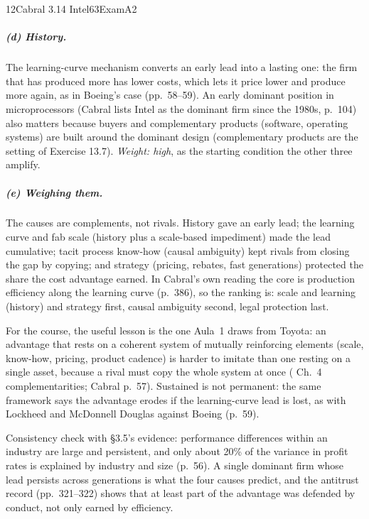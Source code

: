 \begin{exsol}{12}{Cabral 3.14 Intel}{63}{Exam}{A2}
\subparagraph{(d) History.} The learning-curve mechanism converts an early lead into a lasting
one: the firm that has produced more has lower costs, which lets it price lower and produce more
again, as in Boeing's case (pp.~58--59). An early dominant position in microprocessors (Cabral
lists Intel as the dominant firm since the 1980s, p.~104) also matters because buyers and
complementary products (software, operating systems) are built around the dominant design
(complementary products are the setting of Exercise 13.7). \emph{Weight: high}, as the starting
condition the other three amplify.

\subparagraph{(e) Weighing them.} The causes are complements, not rivals. History gave an early
lead; the learning curve and fab scale (history plus a scale-based impediment) made the lead
cumulative; tacit process know-how (causal ambiguity) kept rivals from closing the gap by
copying; and strategy (pricing, rebates, fast generations) protected the share the cost
advantage earned. In Cabral's own reading the core is production efficiency along the learning
curve (p.~386), so the ranking is: scale and learning (history) and strategy first, causal
ambiguity second, legal protection last.

\interp For the course, the useful lesson is the one Aula~1 draws from Toyota: an advantage that
rests on a coherent system of mutually reinforcing elements (scale, know-how, pricing, product
cadence) is harder to imitate than one resting on a single asset, because a rival must copy the
whole system at once (\MR{} Ch.~4 complementarities; Cabral p.~57). Sustained is not permanent:
the same framework says the advantage erodes if the learning-curve lead is lost, as with
Lockheed and McDonnell Douglas against Boeing (p.~59).

\verify Consistency check with \S3.5's evidence: performance differences within an industry are
large and persistent, and only about 20\% of the variance in profit rates is explained by
industry and size (p.~56). A single dominant firm whose lead persists across generations is
what the four causes predict, and the antitrust record (pp.~321--322) shows that at least part
of the advantage was defended by conduct, not only earned by efficiency.

\end{exsol}
